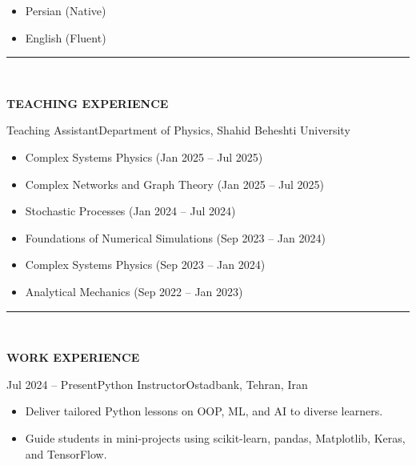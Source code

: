 \documentclass[12pt, b4paper]{cv}
\begin{document}
\begin{multicols}{3}[]
	\begin{itemize}
	\setlength\itemsep{-1pt}
	  \item  Persian (Native)
	  \item  English (Fluent)
	\end{itemize}
\end{multicols}

\vspace{-0.15in}
\rule{\textwidth}{1pt}\\
\vspace{-0.15in}

{\Large \textbf{TEACHING EXPERIENCE}}
\vspace{0.1in}

\begin{work}{}{Teaching Assistant}{Department of Physics, Shahid Beheshti University}
	\vspace{-0.3in}
	\begin{multicols}{2}
		\begin{itemize}
			\item Complex Systems Physics (Jan 2025 – Jul 2025)
			\item Complex Networks and Graph Theory (Jan 2025 – Jul 2025)
			\item Stochastic Processes (Jan 2024 – Jul 2024)
			\item Foundations of Numerical Simulations (Sep 2023 – Jan 2024)
			\item Complex Systems Physics (Sep 2023 – Jan 2024)
			\item Analytical Mechanics (Sep 2022 – Jan 2023)
		\end{itemize}    
	\end{multicols}
\end{work}
\vspace{-0.15in}



\vspace{-0.15in}
\rule{\textwidth}{1pt}\\
\vspace{-0.15in}

{\Large \textbf{WORK EXPERIENCE}}
\vspace{0.1in}

\begin{work}{Jul 2024 -- Present}{Python Instructor}{Ostadbank, Tehran, Iran}
\vspace{-0.1in}
	\begin{itemize}
		\item Deliver tailored Python lessons on OOP, ML, and AI to diverse learners.
		\item Guide students in mini-projects using scikit-learn, pandas, Matplotlib, Keras, and TensorFlow.
	\end{itemize}

\end{work}
\end{document}
